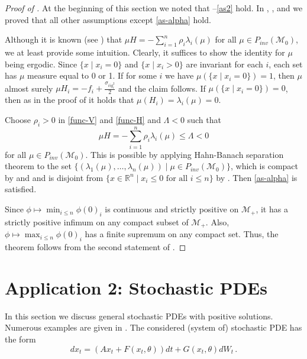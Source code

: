 \documentclass[final]{amsart}
\numberwithin{thm}{section}
\numberwithin{equation}{section}
\newcommand{\mcM}{\mathcal{M}}
\newcommand{\R}{\mathbb{R}}
\newcommand{\inv}{\mathcal{M}_+}
\begin{document}
\begin{proof}[Proof of ]
    At the beginning of this section we noted that --\ref{as2} hold. In , , and  we proved that all other assumptions except \ref{as-alpha} hold.
    
    Although it is known (see \cite[Lemma 2.1]{ecologicalContinuous}) that $\mu H = -\sum_{i=1}^n \rho_i\lambda_i(\mu)$ for all $\mu \in P_{inv}(\mcM_0)$, we at least provide some intuition. Clearly, it suffices to show the identity for $\mu$ being ergodic. Since $\{x\mid x_i = 0\}$ and $\{x\mid x_i > 0\}$ are invariant for each $i$, each set has $\mu$ measure equal to 0 or 1. If for some $i$ we have $\mu(\{x\mid x_i = 0\}) = 1$, then $\mu$ almost surely $\mu H_i = -f_i + \frac{\sigma_{iig_i^2}}{2}$ and the claim follows. If $\mu(\{x\mid x_i = 0\}) = 0$, then as in the proof of  it holds that $\mu(H_i) = \lambda_i(\mu) = 0$. 

    
    Choose $\rho_i > 0$ in \eqref{func-V} and \eqref{func-H} and $\Lambda < 0$ such that 
    $$
    \mu H = -\sum_{i=1}^n \rho_i\lambda_i(\mu) \leq \Lambda < 0
    $$
    for all $\mu \in P_{inv}(\mcM_0)$. This is possible by applying Hahn-Banach separation theorem to the set $\{(\lambda_1(\mu), \dots, \lambda_n(\mu)) \mid \mu \in P_{inv}(\mcM_0)\}$, which is compact by  and  and is disjoint from $\{x \in \R^n \mid x_i \leq 0 \text{ for all } i \leq n\}$ by . Then \ref{as-alpha} is satisfied.

    Since $\phi \mapsto \min_{i \leq n}\phi(0)_i$ is continuous and strictly positive on $\inv$, it has a strictly positive infimum on any compact subset of $\inv$. Also, $\phi \mapsto \max_{i \leq n}\phi(0)_i$ has a finite supremum on any compact set. Thus, the theorem follows from the second statement of .
\end{proof}

\section{Application 2: Stochastic PDEs}\label{section-SPDE}

In this section we discuss general stochastic PDEs with positive solutions. Numerous examples are given in .
The considered (system of) stochastic PDE has the form \begin{equation}\label{SPDE}
    dx_t = (Ax_t + F(x_t,\theta))dt + G(x_t,\theta)dW_t \,.
\end{equation}
\end{document}
